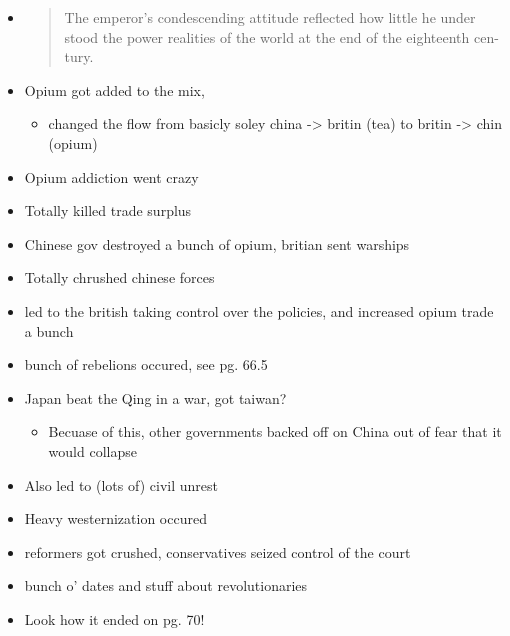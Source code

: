 \documentclass[letterpaper]{article}
\begin{document}
\begin{itemize}
\item \begin{quote}
The emperor's condescending attitude reflected how little he under
stood the power realities of the world at the end of the eighteenth
cen- tury.
\end{quote}

\item Opium got added to the mix,

\begin{itemize}
\item changed the flow from basicly soley china -> britin (tea) to britin
-> chin (opium)
\end{itemize}

\item Opium addiction went crazy

\item Totally killed trade surplus

\item Chinese gov destroyed a bunch of opium, britian sent warships

\item Totally chrushed chinese forces

\item led to the british taking control over the policies, and increased
opium trade a bunch

\item bunch of rebelions occured, see pg. 66.5

\item Japan beat the Qing in a war, got taiwan?

\begin{itemize}
\item Becuase of this, other governments backed off on China out of fear
that it would collapse
\end{itemize}

\item Also led to (lots of) civil unrest

\item Heavy westernization occured

\item reformers got crushed, conservatives seized control of the court

\item bunch o' dates and stuff about revolutionaries

\item Look how it ended on pg. 70!
\end{itemize}
\end{document}
